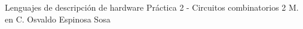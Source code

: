 




	\pnormal
	{Lenguajes de descripción de hardware}
	{Práctica 2  - Circuitos combinatorios 2}
	{M. en C. Osvaldo Espinosa Sosa}
	\tableofcontents
	
	\newpage   
	\newpage   
	\clearpage 
	\clearpage 
	\clearpage 
	\clearpage 
	\newpage   



